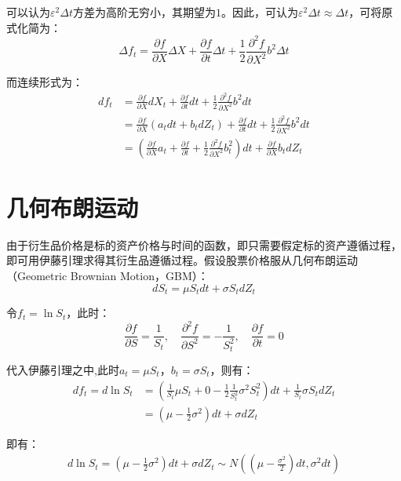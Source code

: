 \documentclass[11pt]{article}
\begin{document}
可以认为$\varepsilon^2 \Delta t$方差为高阶无穷小，其期望为$1$。因此，可认为$\varepsilon^2 \Delta t \approx \Delta t$，可将原式化简为：
\begin{equation*}
    \Delta f_t = \frac{\partial f}{\partial X} \Delta X + \frac{\partial f}{\partial t} \Delta t + \frac{1}{2} \frac{\partial^2 f}{\partial X^2} b^2 \Delta t
\end{equation*}

而连续形式为：
\begin{align*}
    df_t & = \frac{\partial f}{\partial X}  dX_t + \frac{\partial f}{\partial t} dt + \frac{1}{2} \frac{\partial^2 f}{\partial X^2} b^2 dt \\
    & = \frac{\partial f}{\partial X} (a_t dt + b_t dZ_t) + \frac{\partial f}{\partial t} dt + \frac{1}{2} \frac{\partial^2 f}{\partial X^2} b^2 dt \\
    & = \left(\frac{\partial f}{\partial X}a_t  + \frac{\partial f}{\partial t} + \frac{1}{2}\frac{\partial^2 f}{\partial X^2} b^2_t \right)dt + \frac{\partial f}{\partial X} b_t dZ_t
\end{align*}

\section{几何布朗运动}

由于衍生品价格是标的资产价格与时间的函数，即只需要假定标的资产遵循过程，即可用伊藤引理求得其衍生品遵循过程。假设股票价格服从几何布朗运动（Geometric Brownian Motion，GBM）：
\begin{equation*}
    dS_t = \mu S_t dt + \sigma S_t dZ_t
\end{equation*}

令$f_t = \ln S_t$，此时：
\begin{equation*}
    \frac{\partial f}{\partial S} = \frac{1}{S_t}, \quad
    \frac{\partial^2 f}{\partial S^2} = -\frac{1}{S_t^2}, \quad
    \frac{\partial f}{\partial t} = 0
\end{equation*}

代入伊藤引理之中,此时$a_t=\mu S_t$，$b_t=\sigma S_t$，则有：
\begin{align*}
    df_t = d \ln S_t & = \left( \frac{1}{S_t}\mu S_t + 0 - \frac{1}{2} \frac{1}{S_t^2} \sigma^2 S_t^2 \right) dt + \frac{1}{S_t}\sigma S_t dZ_t \\
    & = \left( \mu - \frac{1}{2}\sigma^2\right)dt + \sigma dZ_t
\end{align*}

即有：
\begin{align*}
    d\ln S_t= \left( \mu - \frac{1}{2}\sigma^2\right) dt + \sigma dZ_t \sim N \left( (\mu-\frac{\sigma^2}{2})dt, \sigma^2 dt \right)
\end{align*}
\end{document}
